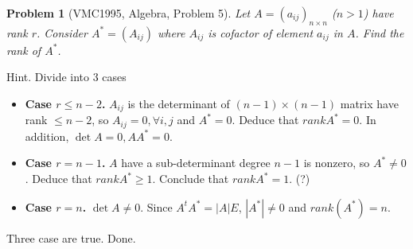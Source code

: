 \documentclass{article}
\newtheorem{problem}{Problem}
\begin{document}
\begin{problem}[VMC1995, Algebra, Problem 5]
	Let $A = {\left( {{a_{ij}}} \right)_{n \times n}}$ ($n>1$) have rank $r$. Consider ${A^*} = \left( {{A_{ij}}} \right)$ where ${A_{ij}}$ is cofactor of element $a_{ij}$ in $A$. Find the rank of $A^{*}$.
\end{problem}
{\sf Hint.} Divide into 3 cases
\begin{itemize}
	\item \textbf{Case $r \le n - 2$.} $A_{ij}$ is the determinant of $\left( {n - 1} \right) \times \left( {n - 1} \right)$ matrix have rank $\le n-2$, so $A_{ij}=0, \forall i,j$ and ${A^*} = 0$. Deduce that $rank {A^*} = 0$. In addition, $\det A = 0,A{A^*} = 0$.
	\item \textbf{Case $r=n-1$.} $A$ have a sub-determinant degree $n-1$ is nonzero, so ${A^*} \ne 0$. Deduce that $rank {A^*} \ge 1$. Conclude that $rank {A^*} = 1$. (?)
	\item \textbf{Case $r=n$.} $\det A \ne 0$. Since ${A^t}{A^*} = \left| A \right|E$, $\left| {{A^*}} \right| \ne 0$ and $rank\left( {{A^*}} \right) = n$. 
\end{itemize}
Three case are true. Done.
\end{document}
